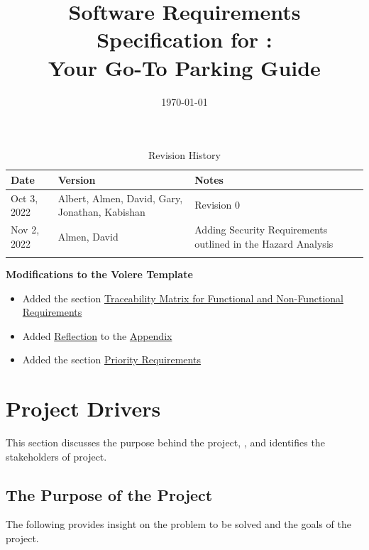 \documentclass[12pt,letterpaper]{article}
\title{Software Requirements Specification for \progname: \\ Your Go-To  Parking Guide}
\author{\authname}
\date{\today}
\begin{document}
\maketitle
\newpage
{}
\tableofcontents
\listoftables
\listoffigures

\newpage 
\begin{table}[h!]
\caption{Revision History}
\begin{tabularx}{\textwidth}{p{3cm}p{2cm}X} \toprule {\bf Date} & {\bf Version}
& {\bf Notes}\\
\midrule
Oct 3, 2022 & Albert, Almen, David, Gary, Jonathan, Kabishan & Revision 0\\
\midrule
Nov 2, 2022 & Almen, David & Adding Security Requirements outlined in the Hazard
Analysis\\
\midrule
\color{red}{Apr 1, 2022} & \color{red}{Albert, Almen, David, Gary, Jonathan,
Kabishan} & \color{red}{Revision 1}\\
\bottomrule
\end{tabularx}
\end{table}

\noindent \textbf{Modifications to the Volere\cite{volere} Template}
\begin{itemize}
    \item Added the section \hyperref[traceabilityMatrixSection]{Traceability
    Matrix for Functional and Non-Functional Requirements}
    \item Added \hyperref[reflection]{Reflection} to the
    \hyperref[appendix]{Appendix}
    \item Added the section \hyperref[priorityreqs]{Priority Requirements} 
\end{itemize}
\newpage


\section{Project Drivers}
This section discusses the purpose behind the project, \progname, and identifies
the stakeholders of project.

\subsection{The Purpose of the Project}
The following provides insight on the problem to be solved and the goals of the
project.
\end{document}
